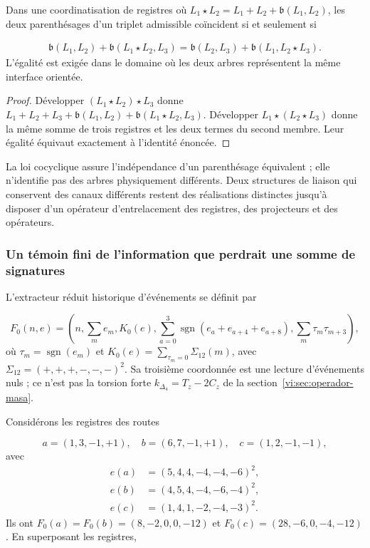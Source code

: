 \begin{proposition}
\label{vi:prop:cociclo-compuesto}
Dans une coordinatisation de registres où
\(L_1\star L_2=L_1+L_2+\mathfrak b(L_1,L_2)\), les deux
parenthésages d’un triplet admissible coïncident si et seulement si

\begin{align*}
 \mathfrak b(L_1,L_2)+\mathfrak b(L_1\star L_2,L_3)
 =\mathfrak b(L_2,L_3)+\mathfrak b(L_1,L_2\star L_3).
\end{align*}
L’égalité est exigée dans le domaine où les deux arbres représentent la
même interface orientée.

\end{proposition}
\begin{proof}
Développer \((L_1\star L_2)\star L_3\) donne
\(L_1+L_2+L_3+\mathfrak b(L_1,L_2)+\mathfrak b(L_1\star L_2,L_3)\).
Développer \(L_1\star(L_2\star L_3)\) donne la même somme de trois
registres et les deux termes du second membre. Leur égalité équivaut
exactement à l’identité énoncée.

\end{proof}

La loi cocyclique assure l’indépendance d’un parenthésage équivalent ;
elle n’identifie pas des arbres physiquement différents. Deux structures de liaison
qui conservent des canaux différents restent des réalisations distinctes
jusqu’à disposer d’un opérateur d’entrelacement des registres, des projecteurs et des opérateurs.


\subsubsection{Un témoin fini de l’information que perdrait une somme de signatures
}

L’extracteur réduit historique d’événements se définit par

\[
 F_0(n,e)=\left(n,\sum_m e_m,K_0(e),
 \sum_{a=0}^3\operatorname{sgn}(e_a+e_{a+4}+e_{a+8}),
 \sum_m\tau_m\tau_{m+3}\right),
\]
où \(\tau_m=\operatorname{sgn}(e_m)\) et
\(K_0(e)=\sum_{\tau_m=0}\Sigma_{12}(m)\), avec
\(\Sigma_{12}=(+,+,+,-,-,-)^2\). Sa troisième coordonnée est une
lecture d’événements nuls ; ce n’est pas la torsion forte
\(k_{\Delta_4}=T_z-2C_z\) de la
section~\ref{vi:sec:operador-masa}.


Considérons les registres des routes

\[
 a=(1,3,-1,+1),\quad b=(6,7,-1,+1),\quad c=(1,2,-1,-1),
\]
avec
\begin{align*}
 e(a)&=(5,4,4,-4,-4,-6)^2,\\
 e(b)&=(4,5,4,-4,-6,-4)^2,\\
 e(c)&=(1,4,1,-2,-4,-3)^2.
\end{align*}
Ils ont \(F_0(a)=F_0(b)=(8,-2,0,0,-12)\) et
\(F_0(c)=(28,-6,0,-4,-12)\). En superposant les registres,

